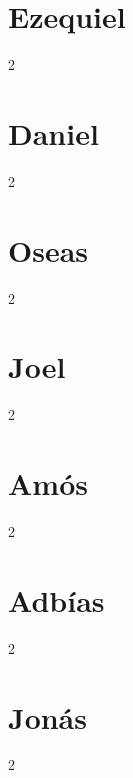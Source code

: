 \chapter{Ezequiel}
\begin{multicols}{2}
  \raggedcolumns
  \parskip=0pt \relax
  
\end{multicols}

\chapter{Daniel}
\begin{multicols}{2}
  \raggedcolumns
  \parskip=0pt \relax
  
\end{multicols}

\chapter{Oseas}
\begin{multicols}{2}
  \raggedcolumns
  \parskip=0pt \relax
  
\end{multicols}

\chapter{Joel}
\begin{multicols}{2}
  \raggedcolumns
  \parskip=0pt \relax
  
\end{multicols}

\chapter{Amós}
\begin{multicols}{2}
  \raggedcolumns
  \parskip=0pt \relax
  
\end{multicols}

\chapter{Adbías}
\begin{multicols}{2}
  \raggedcolumns
  \parskip=0pt \relax
  
\end{multicols}

\chapter{Jonás}
\begin{multicols}{2}
  \raggedcolumns
  \parskip=0pt \relax
  
\end{multicols}

